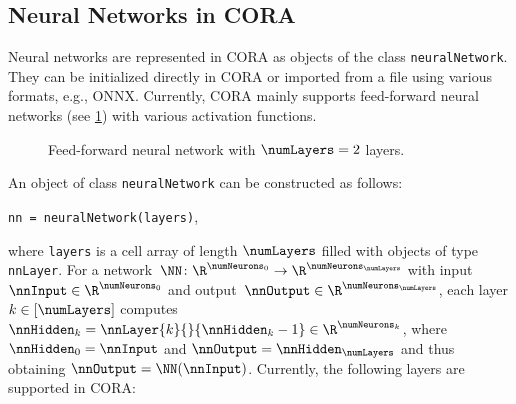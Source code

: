 \subsection{Neural Networks in CORA}
\label{sec:neuralNetworkInit}

Neural networks are represented in CORA as objects of the class \texttt{neuralNetwork}.
They can be initialized directly in CORA or imported from a file using various formats, e.g., ONNX.
Currently, CORA mainly supports feed-forward neural networks (see \cref{fig:neuralNetwork}) with various activation functions.

\begin{figure}[htb]
  \centering	
    \footnotesize
    \caption{Feed-forward neural network with $\numLayers = 2$ layers.}
    \label{fig:neuralNetwork}
\end{figure}

An object of class \texttt{neuralNetwork} can be constructed as follows:
\begin{center}
	\texttt{nn = neuralNetwork(layers)},
\end{center}
where \texttt{layers} is a cell array of length $\numLayers$ filled with objects of type \texttt{nnLayer}.
For a network~$\NN\colon\R^{\numNeurons_0}\to\R^{\numNeurons_{\numLayers}}$ with input~$\nnInput\in\R^{\numNeurons_0}$ and output~$\nnOutput\in\R^{\numNeurons_\numLayers}$,
each layer $k\in[\numLayers]$ computes $\nnHidden_k = \nnLayer{k}{}{\nnHidden_k-1}\in\R^{\numNeurons_k}$,
where $\nnHidden_0 = \nnInput$ and $\nnOutput = \nnHidden_\numLayers$ and thus obtaining $\nnOutput=\NN(\nnInput)$.
Currently, the following layers are supported in CORA:

